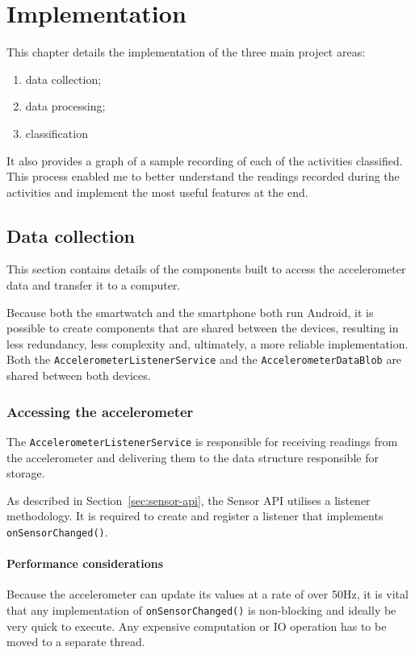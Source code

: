 \chapter{Implementation}
  This chapter details the implementation of the three main project areas:
  \begin{enumerate}
    \item data collection;
    \item data processing;
    \item classification
  \end{enumerate}
  
  It also provides a graph of a sample recording of each of the activities classified. This process enabled me to better understand the readings recorded during the activities and implement the most useful features at the end.
  
  \section{Data collection}
    This section contains details of the components built to access the accelerometer data and transfer it to a computer.
    
    Because both the smartwatch and the smartphone both run Android, it is possible to create components that are shared between the devices, resulting in less redundancy, less complexity and, ultimately, a more reliable implementation. Both the \texttt{AccelerometerListenerService} and the \texttt{AccelerometerDataBlob} are shared between both devices.
    
    \subsection{Accessing the accelerometer}
      The \texttt{AccelerometerListenerService} is responsible for receiving readings from the accelerometer and delivering them to the data structure responsible for storage.
      
      As described in Section~\ref{sec:sensor-api}, the Sensor API utilises a listener methodology. It is required to create and register a listener that implements \texttt{onSensorChanged()}. 
      
      \subsubsection{Performance considerations}
        Because the accelerometer can update its values at a rate of over 50\si{Hz}, it is vital that any implementation of \texttt{onSensorChanged()} is non-blocking and ideally be very quick to execute. Any expensive computation or IO operation has to be moved to a separate thread.
        
